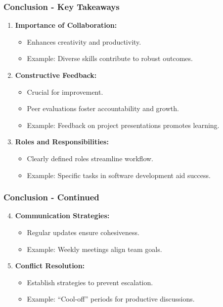 \documentclass[aspectratio=169]{beamer}
\begin{document}
\begin{frame}[fragile]
    \frametitle{Conclusion - Key Takeaways}
    \begin{enumerate}
        \item \textbf{Importance of Collaboration:}
        \begin{itemize}
            \item Enhances creativity and productivity.
            \item Example: Diverse skills contribute to robust outcomes.
        \end{itemize}

        \item \textbf{Constructive Feedback:}
        \begin{itemize}
            \item Crucial for improvement.
            \item Peer evaluations foster accountability and growth.
            \item Example: Feedback on project presentations promotes learning.
        \end{itemize}

        \item \textbf{Roles and Responsibilities:}
        \begin{itemize}
            \item Clearly defined roles streamline workflow.
            \item Example: Specific tasks in software development aid success.
        \end{itemize}
    \end{enumerate}
\end{frame}

\begin{frame}[fragile]
    \frametitle{Conclusion - Continued}
    \begin{enumerate}
        \setcounter{enumi}{3} %
        \item \textbf{Communication Strategies:}
        \begin{itemize}
            \item Regular updates ensure cohesiveness.
            \item Example: Weekly meetings align team goals.
        \end{itemize}

        \item \textbf{Conflict Resolution:}
        \begin{itemize}
            \item Establish strategies to prevent escalation.
            \item Example: “Cool-off” periods for productive discussions.
        \end{itemize}
    \end{enumerate}
\end{frame}
\end{document}
